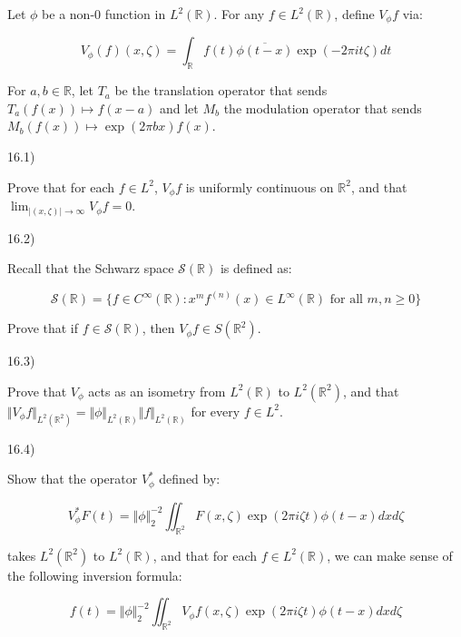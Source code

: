 \documentclass[10pt]{article}
\newenvironment{problem}[2][]{\begin{trivlist}
\item[\hskip \labelsep {\bfseries #1}\hskip \labelsep {\bfseries #2.}]}{\end{trivlist}}
\begin{document}
\begin{problem}{Question 16}

Let $\phi$ be a non-0 function in $L^2(\mathbb{R})$. For any $f \in L^2(\mathbb{R})$, define $V_\phi f$ via:

$$ V_\phi(f)(x, \zeta) = \int_{\mathbb{R}} f(t) \overline{\phi(t-x)} \exp(-2 \pi i t \zeta) dt $$

For $a, b \in \mathbb{R}$, let $T_a$ be the translation operator that sends $T_a(f(x)) \mapsto f(x -a )$ and let $M_b$ the modulation operator that sends $M_b(f(x)) \mapsto \exp(2 \pi bx)f(x)$.

16.1)

Prove that for each $f\in L^2$, $V_\phi f$ is uniformly continuous on $\mathbb{R}^2$, and that $\lim_{|(x, \zeta)| \to \infty} V_\phi f = 0$.

16.2)

Recall that the Schwarz space $\mathcal{S}(\mathbb{R})$ is defined as:

$$ \mathcal{S}(\mathbb{R}) = \{ f \in C^\infty(\mathbb{R}) : x^m f^{(n)}(x) \in L^\infty(\mathbb{R}) \text{ for all } m, n \geq 0 \}$$

Prove that if $f \in \mathcal{S}(\mathbb{R})$, then $V_\phi f \in S(\mathbb{R}^2)$.

16.3)

Prove that $V_\phi$ acts as an isometry from $L^2(\mathbb{R})$ to $L^2(\mathbb{R}^2)$, and that $\Vert V_\phi f \Vert_{L^2(\mathbb{R}^2)} = \Vert \phi \Vert_{L^2(\mathbb{R})} \Vert f \Vert_{L^2(\mathbb{R})}$ for every $f \in L^2$.

16.4)

Show that the operator $V_\phi^*$ defined by:

$$ V_\phi^* F(t) = \Vert \phi\Vert_2^{-2} \iint_{\mathbb{R}^2} F(x, \zeta) \exp(2\pi i \zeta t) \phi(t - x) dx d\zeta $$

takes $L^2(\mathbb{R}^2)$ to $L^2(\mathbb{R})$, and that for each $f \in L^2(\mathbb{R})$, we can make sense of the following inversion formula:

$$ f(t) = \Vert \phi \Vert_2^{-2} \iint_{\mathbb{R}^2} V_\phi f(x, \zeta) \exp(2 \pi i \zeta t) \phi(t - x) dx d\zeta $$

\end{problem}
\end{document}
